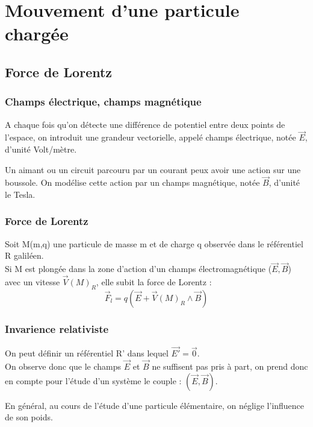 \chapter{Mouvement d'une particule chargée}
\section{Force de Lorentz}
\subsection{Champs électrique, champs magnétique}
\begin{de}
A chaque fois qu'on détecte une différence de potentiel entre deux points de l'espace, on introduit une grandeur vectorielle, appelé champs électrique, notée $\overrightarrow{E}$, d'unité Volt/mètre.
\end{de}
\begin{de}
Un aimant ou un circuit parcouru par un courant peux avoir une action sur une boussole. On modélise cette action par un champs magnétique, notée $\overrightarrow{B}$, d'unité le Tesla.
\end{de}
\subsection{Force de Lorentz}
\begin{de}
Soit M(m,q) une particule de masse m et de charge q observée dans le référentiel R galiléen.\\
Si M est plongée dans la zone d'action d'un champs électromagnétique ($\overrightarrow{E},\overrightarrow{B}$) avec un vitesse $\overrightarrow{V}(M)_R$, elle subit la force de Lorentz :
$$\overrightarrow{F}_l = q(\overrightarrow{E}+\overrightarrow{V}(M)_R\wedge\overrightarrow{B})$$
\end{de}
\subsection{Invarience relativiste}
\begin{prop}
On peut définir un référentiel R' dans lequel $\overrightarrow{E'}=\overrightarrow{0}$.\\
On observe donc que le champs $\overrightarrow{E}$ et $\overrightarrow{B}$ ne suffisent pas pris à part, on prend donc en compte pour l'étude d'un système le couple : $(\overrightarrow{E},\overrightarrow{B})$.
\end{prop}
\begin{prop}
En général, au cours de l'étude d'une particule élémentaire, on néglige l'influence de son poids.
\end{prop}

